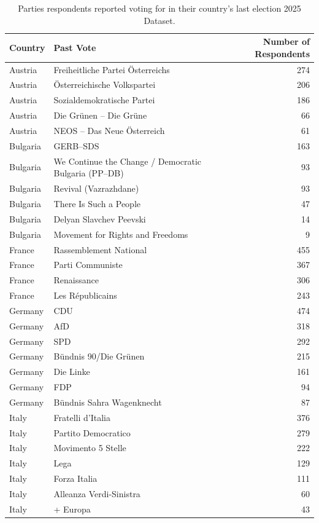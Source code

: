 \begin{table}

\caption{Parties respondents reported voting for in their country's last election 2025 Dataset.\label{tab:countries_vote} }
\centering
\begin{tabular}[t]{llr}
\toprule
Country & Past Vote & Number of Respondents\\
\midrule
Austria & Freiheitliche Partei Österreichs & 274\\
Austria & Österreichische Volkspartei & 206\\
Austria & Sozialdemokratische Partei & 186\\
Austria & Die Grünen – Die Grüne & 66\\
Austria & NEOS – Das Neue Österreich & 61\\
Bulgaria & GERB–SDS & 163\\
Bulgaria & We Continue the Change / Democratic Bulgaria (PP–DB) & 93\\
Bulgaria & Revival (Vazrazhdane) & 93\\
Bulgaria & There Is Such a People & 47\\
Bulgaria & Delyan Slavchev Peevski & 14\\
Bulgaria & Movement for Rights and Freedoms & 9\\
France & Rassemblement National & 455\\
France & Parti Communiste & 367\\
France & Renaissance & 306\\
France & Les Républicains & 243\\
Germany & CDU & 474\\
Germany & AfD & 318\\
Germany & SPD & 292\\
Germany & Bündnis 90/Die Grünen & 215\\
Germany & Die Linke & 161\\
Germany & FDP & 94\\
Germany & Bündnis Sahra Wagenknecht & 87\\
Italy & Fratelli d'Italia & 376\\
Italy & Partito Democratico & 279\\
Italy & Movimento 5 Stelle & 222\\
Italy & Lega & 129\\
Italy & Forza Italia & 111\\
Italy & Alleanza Verdi-Sinistra & 60\\
Italy & + Europa & 43\\

\end{tabular}
\end{table}
